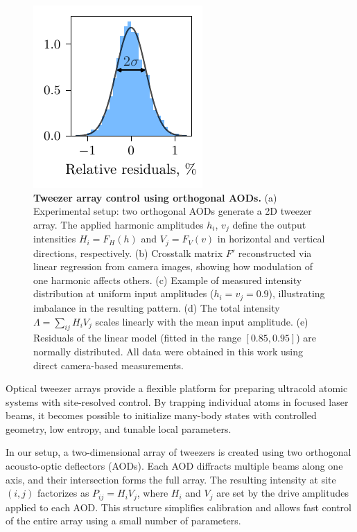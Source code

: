 \begin{figure}
    \phantom{42}
    \includegraphics{fig-py/crosstalk-camera-res.pdf}
    \caption{
        \textbf{Tweezer array control using orthogonal AODs.}
        (a) Experimental setup: two orthogonal AODs generate a 2D tweezer array. The applied harmonic amplitudes $h_i$, $v_j$ define the output intensities $H_i = F_H(h)$ and $V_j = F_V(v)$ in horizontal and vertical directions, respectively. 
        (b) Crosstalk matrix $F'$ reconstructed via linear regression from camera images, showing how modulation of one harmonic affects others. 
        (c) Example of measured intensity distribution at uniform input amplitudes ($h_i = v_j = 0.9$), illustrating imbalance in the resulting pattern. 
        (d) The total intensity $\Lambda = \sum_{ij} H_i V_j$ scales linearly with the mean input amplitude. 
        (e) Residuals of the linear model (fitted in the range $[0.85, 0.95]$) are normally distributed. 
        All data were obtained in this work using direct camera-based measurements.
    }
    \label{fig:control}
\end{figure}


Optical tweezer arrays provide a flexible platform for preparing ultracold atomic systems with site-resolved control. By trapping individual atoms in focused laser beams, it becomes possible to initialize many-body states with controlled geometry, low entropy, and tunable local parameters.

In our setup, a two-dimensional array of tweezers is created using two orthogonal acousto-optic deflectors (AODs). Each AOD diffracts multiple beams along one axis, and their intersection forms the full array. The resulting intensity at site $(i,j)$ factorizes as $P_{ij} = H_i V_j$, where $H_i$ and $V_j$ are set by the drive amplitudes applied to each AOD. This structure simplifies calibration and allows fast control of the entire array using a small number of parameters.


